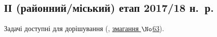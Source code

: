 \renewenvironment{problemAllDefault}[1]{\vspace{10mm}\par\begin{problem}{#1}{\stdinOrInputTxt}{\stdoutOrOutputTxt}{1 сек}{128 мегабайтів}}{\end{problem}}

\subsection{ІІ (районний/міський) етап 2017/18 н.~р.}

Задачі доступні для дорішування (\EjudgeCkipoName, \href{https://ejudge.ckipo.edu.ua/cgi-bin/new-register?contest_id=63}{змагання $\No$63}).



\vspace{-0.5\baselineskip minus 1cm}
	

	

	

	


